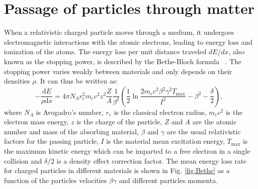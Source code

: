 \section{Passage of particles through matter}
\label{Sec:Passage}

When a relativistic charged particle moves through a medium, it undergoes electromagnetic interactions with the atomic electrons, leading to energy loss and ionization of the atoms. The energy loss per unit distance traveled $dE/dx$, also known as the stopping power, is described by the Bethe-Bloch formula ~\cite{PDG}. The stopping power varies weakly between materials and only depends on their densities $\rho$. It can thus be written as:
\begin{equation} \label{eq:Bethe}
    -\frac{\textrm{d}E}{\rho\textrm{d}x} = 4\pi N_{A}r_e^2m_ec^2z^2\frac{Z}{A}\frac{1}{\beta^2}\left(\frac{1}{2}\ln{\frac{2m_ec^2\beta^2\gamma^2T_{\textrm{max}}}{I^2}}-\beta^2-\frac{\delta}{2}\right),
\end{equation}
where $N_{A}$ is Avogadro's number, $r_e$ is the classical electron radius, $m_ec^2$ is the electron mass energy, $z$ is the charge of the particle, $Z$ and $A$ are the atomic number and mass of the absorbing material, $\beta$ and $\gamma$ are the usual relativistic factors for the passing particle, $I$ is the material mean excitation energy, $T_{\textrm{max}}$ is the maximum kinetic energy which can be imparted to a free electron in a single collision and $\delta/2$ is a density effect correction factor. The mean energy loss rate for charged particles in different materials is shown in Fig. \ref{fig:Bethe} as a function of the particles velocities $\beta\gamma$ and different particles momenta.

